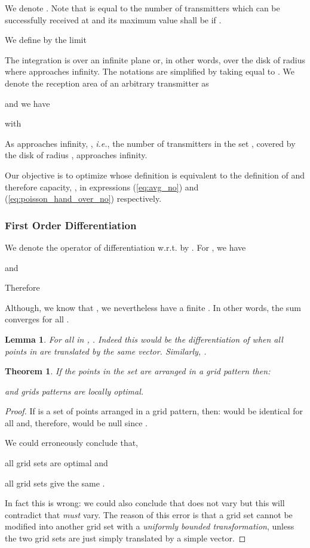 \documentclass[12pt,english]{article}
\newtheorem{lemma}{Lemma}[section]
\newtheorem{theorem}{Theorem}[section]
\begin{document}
We denote \mbox{}. Note that  is equal to the number of transmitters which can be successfully received at  and its maximum value shall be  if \mbox{}. 

We define  by the limit

The integration is over an infinite plane or, in other words, over the disk of radius  where  approaches infinity. The notations are simplified by taking  equal to . We denote the reception area of an arbitrary transmitter  as 

and we have 

with

As  approaches infinity, , {\it i.e.}, the number of transmitters in the set , covered by the disk of radius , approaches infinity. 

Our objective is to optimize  whose definition is equivalent to the definition of  and therefore capacity, , in expressions (\ref{eq:avg_no}) and (\ref{eq:poisson_hand_over_no}) respectively. 

\subsubsection{First Order Differentiation}
\label{sec:grid_first_order}

We denote the operator of differentiation w.r.t.  by . For \mbox{}, we have 
 
and 
 
Therefore

Although, we know that \mbox{}, we nevertheless have a finite . In other words, the sum  converges for all . 

\begin{lemma}
For all  in , \mbox{}. Indeed this would be the differentiation of  when all points in  are translated by the same vector. Similarly, \mbox{}. 
\end{lemma}

\begin{theorem}
If the points in the set  are arranged in a grid pattern then: 
 
and grids patterns are {\em locally} optimal. \end{theorem}

\begin{proof}
If  is a set of points arranged in a grid pattern, then: \mbox{} would be identical for all  and, therefore, would be null since \mbox{}. 

We could erroneously conclude that,
\begin{compactitem}[-]
\item all grid sets are optimal and
\item all grid sets give the same .
\end{compactitem}
In fact this is wrong: we could also conclude that  does not vary but this will contradict that  {\em must} vary. The reason of this error is that a grid set cannot be modified into another grid set with a {\em uniformly bounded transformation}, unless the two grid sets are just simply translated by a simple vector. 
\end{proof}
\end{document}
